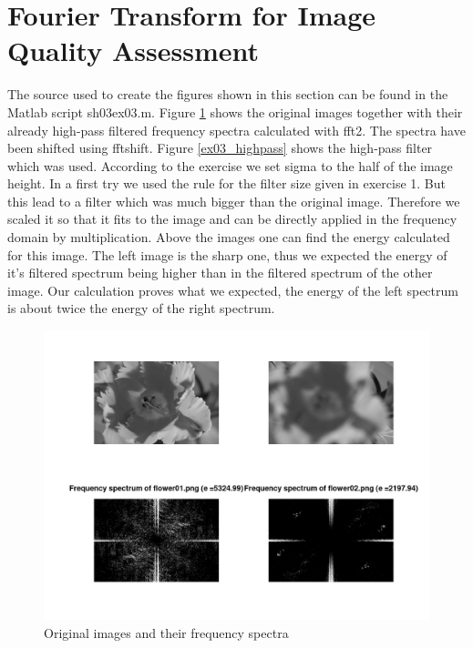 \documentclass{article}
\begin{document}
\section{Fourier Transform for Image Quality Assessment}
The source used to create the figures shown in this section can be found in the Matlab script sh03ex03.m.
Figure \ref{ex03} shows the original images together with their already high-pass filtered frequency spectra calculated with fft2. The spectra have been shifted using fftshift. Figure \ref{ex03_highpass} shows the high-pass filter which was used. According to the exercise we set sigma to the half of the image height. In a first try we used the rule for the filter size given in exercise 1. But this lead to a filter which was much bigger than the original image. Therefore we scaled it so that it fits to the image and can be directly applied in the frequency domain by multiplication. Above the images one can find the energy calculated for this image. The left image is the sharp one, thus we expected the energy of it's filtered spectrum being higher than in the filtered spectrum of the other image. Our calculation proves what we expected, the energy of the left spectrum is about twice the energy of the right spectrum. 

\begin{figure}[H]
	\begin{center}
		\includegraphics[width=\textwidth]{./images/ex03_1.png}
		\caption{Original images and their frequency spectra}
    \label{ex03}
	\end{center}
\end{figure}
\end{document}
